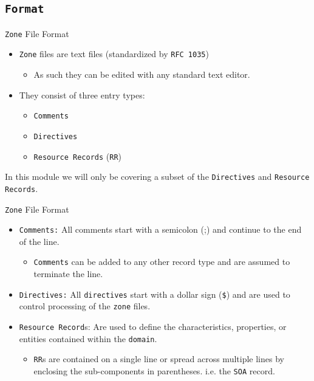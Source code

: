 \documentclass[xcolor=table]{beamer}
\begin{document}
\subsection{\texttt{Format}}
\begin{frame}{\texttt{Zone} File Format}
  \begin{itemize}
    \item \texttt{Zone} files are text files (standardized by \texttt{RFC 1035})
      \begin{itemize}
        \item As such they can be edited with any standard text editor.
      \end{itemize}
    \item They consist of three entry types:
      \begin{itemize}
        \item \texttt{Comments}
        \item \texttt{Directives}
        \item \texttt{Resource Records} (\texttt{RR})
      \end{itemize}
  \end{itemize}
  \begin{tcolorbox}[title={\textbf{NOTE:}}]
    In this module we will only be covering a subset of the \texttt{Directives} and \texttt{Resource Records}.
  \end{tcolorbox}  
\end{frame}

\begin{frame}{\texttt{Zone} File Format}
  \begin{itemize}
    \item \texttt{Comments:} All comments start with a semicolon (;) and continue to the end of the line. 
      \begin{itemize}
        \item \texttt{Comments} can be added to any other record type and are assumed to terminate the line.
      \end{itemize}
    \item \texttt{Directives:} All \texttt{directives} start with a dollar sign (\texttt{\$}) and are used to control processing of the \texttt{zone} files.
    \item \texttt{Resource Record}s: Are used to define the characteristics, properties, or entities contained within the \texttt{domain}. 
    \begin{itemize}
        \item \texttt{RR}s are contained on a single line or spread across multiple lines by enclosing the sub-components in parentheses. i.e. the \texttt{SOA} record.
      \end{itemize}
  \end{itemize}
\end{frame}
\end{document}
